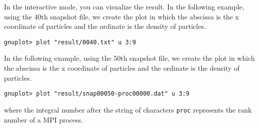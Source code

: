 In the interactive mode, you can visualize the result. 
\ifCpp %
In the following example, using the 40th snapshot file, we create the
plot in which the abscissa is the x coordinate of particles and the ordinate is the density of particles.
\begin{screen}
\begin{verbatim}
gnuplot> plot "result/0040.txt" u 3:9
\end{verbatim}
\end{screen}
\endifCpp 
\ifIF %
In the following example, using the 50th snapshot file, we create the plot in which the abscissa is the x coordinate of particles and the ordinate is the density of particles.

\begin{screen}
\begin{verbatim}
gnuplot> plot "result/snap00050-proc00000.dat" u 3:9
\end{verbatim}
\end{screen}
where the integral number after the string of characters \texttt{proc} represents the rank number of a MPI process.
\endifIF

